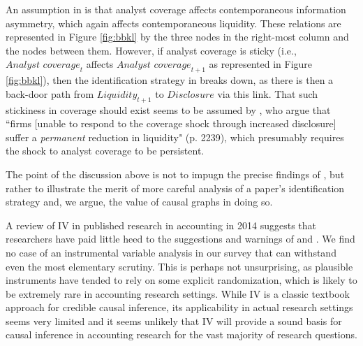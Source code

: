 \documentclass[11pt]{amsart}
\begin{document}
An assumption in \citet{Kelly:2012ih} is that analyst coverage affects contemporaneous information asymmetry, which again affects contemporaneous liquidity.
These relations are represented in Figure \ref{fig:bbkl} by the three nodes in the right-most column and the nodes between them.
However, if analyst coverage is sticky (i.e., $\textit{Analyst coverage}_t$ affects $\textit{Analyst coverage}_{t+1}$ as represented in Figure \ref{fig:bbkl}), then the identification strategy in \citet{Balakrishnan:2014js} breaks down, as there is then a back-door path from $\textit{Liquidity}_{t+1}$ to $\textit{Disclosure}$ via this link.
That such stickiness in coverage should exist seems to be assumed by \citet{Balakrishnan:2014js}, who argue that ``firms [unable to respond  to the coverage shock through increased disclosure] suffer a \emph{permanent} reduction in liquidity" (p. 2239), which presumably requires the shock to analyst coverage to be persistent.

The point of the discussion above is not to impugn the precise findings of \citet{Balakrishnan:2014js}, but rather to illustrate the merit of more careful analysis of a paper's identification strategy and, we argue, the value of causal graphs in doing so.

A review of IV in published research in accounting in 2014 suggests that researchers have paid little heed to the suggestions and warnings of  \citet{Larcker:2010fq} and \citet{Roberts:2013cz}.
We find no case of an instrumental variable analysis in our survey that can withstand even the most elementary scrutiny.
This is perhaps not unsurprising, as plausible instruments have tended to rely on some explicit randomization, which is likely to be extremely rare in accounting research settings.
While IV is a classic textbook approach for credible causal inference, its applicability in actual research settings seems very limited and it seems unlikely that IV will provide a sound basis for causal inference in accounting research for the vast majority of research questions.
 
\end{document}

